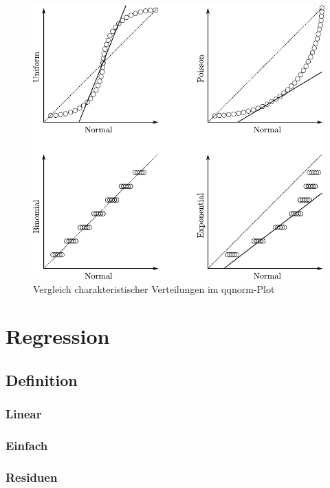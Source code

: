 \begin{figure}
        \centering
        \includegraphics[scale=\graphscale]{qqnorm-kurven.pdf}
        \caption{Vergleich charakteristischer Verteilungen im qqnorm-Plot}
\end{figure}

\section{Regression}

\subsection{Definition}

\subsubsection{Linear}

\subsubsection{Einfach}

\subsubsection{Residuen}

